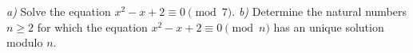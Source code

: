 \textit{a)} Solve the equation $ x^2-x+2\equiv 0\pmod 7. $
\textit{b)} Determine the natural numbers $ n\ge 2 $ for which the equation $ x^2-x+2\equiv 0\pmod n $ has an unique solution modulo $ n. $